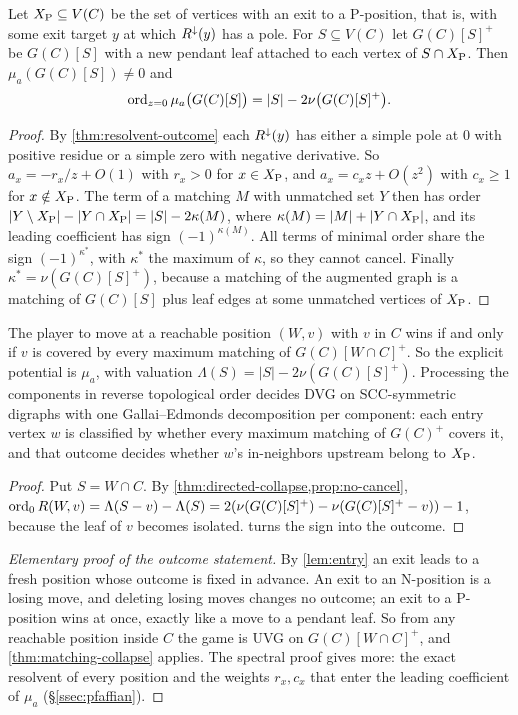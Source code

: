 \begin{proposition}\label{prop:no-cancel}
Let $X_{\mathrm{P}}\subseteq V(C)$ be the set of vertices with an exit to a P-position, that is, with some exit target $y$ at which $R^{\downarrow}(y)$ has a pole. For $S\subseteq V(C)$ let $G(C)[S]^{+}$ be $G(C)[S]$ with a new pendant leaf attached to each vertex of $S\cap X_{\mathrm{P}}$. Then $\mu_a(G(C)[S])\neq0$ and
\[
\operatorname{ord}_{z=0}\mu_a\bigl(G(C)[S]\bigr)=|S|-2\nu\bigl(G(C)[S]^{+}\bigr).
\]
\end{proposition}
\begin{proof}
By \cref{thm:resolvent-outcome} each $R^{\downarrow}(y)$ has either a simple pole at $0$ with positive residue or a simple zero with negative derivative. So $a_x=-r_x/z+O(1)$ with $r_x>0$ for $x\in X_{\mathrm{P}}$, and $a_x=c_xz+O(z^2)$ with $c_x\ge1$ for $x\notin X_{\mathrm{P}}$. The term of a matching $M$ with unmatched set $Y$ then has order $|Y\setminus X_{\mathrm{P}}|-|Y\cap X_{\mathrm{P}}|=|S|-2\kappa(M)$, where $\kappa(M)=|M|+|Y\cap X_{\mathrm{P}}|$, and its leading coefficient has sign $(-1)^{\kappa(M)}$. All terms of minimal order share the sign $(-1)^{\kappa^{*}}$, with $\kappa^{*}$ the maximum of $\kappa$, so they cannot cancel. Finally $\kappa^{*}=\nu(G(C)[S]^{+})$, because a matching of the augmented graph is a matching of $G(C)[S]$ plus leaf edges at some unmatched vertices of $X_{\mathrm{P}}$.
\end{proof}

\begin{corollary}\label{cor:dvg-poly}
The player to move at a reachable position $(W,v)$ with $v$ in $C$ wins if and only if $v$ is covered by every maximum matching of $G(C)[W\cap C]^{+}$. So the explicit potential is $\mu_a$, with valuation $\Lambda(S)=|S|-2\nu(G(C)[S]^{+})$. Processing the components in reverse topological order decides DVG on SCC-symmetric digraphs with one Gallai--Edmonds decomposition per component: each entry vertex $w$ is classified by whether every maximum matching of $G(C)^{+}$ covers it, and that outcome decides whether $w$'s in-neighbors upstream belong to $X_{\mathrm{P}}$.
\end{corollary}
\begin{proof}
Put $S=W\cap C$. By \cref{thm:directed-collapse,prop:no-cancel}, $\operatorname{ord}_0R(W,v)=\Lambda(S-v)-\Lambda(S)=2(\nu(G(C)[S]^{+})-\nu(G(C)[S]^{+}-v))-1$, because the leaf of $v$ becomes isolated.  turns the sign into the outcome.
\end{proof}

\begin{proof}[Elementary proof of the outcome statement]
By \cref{lem:entry} an exit leads to a fresh position whose outcome is fixed in advance. An exit to an N-position is a losing move, and deleting losing moves changes no outcome; an exit to a P-position wins at once, exactly like a move to a pendant leaf. So from any reachable position inside $C$ the game is UVG on $G(C)[W\cap C]^{+}$, and \cref{thm:matching-collapse} applies. The spectral proof gives more: the exact resolvent of every position and the weights $r_x,c_x$ that enter the leading coefficient of $\mu_a$ (\S\ref{ssec:pfaffian}).
\end{proof}

